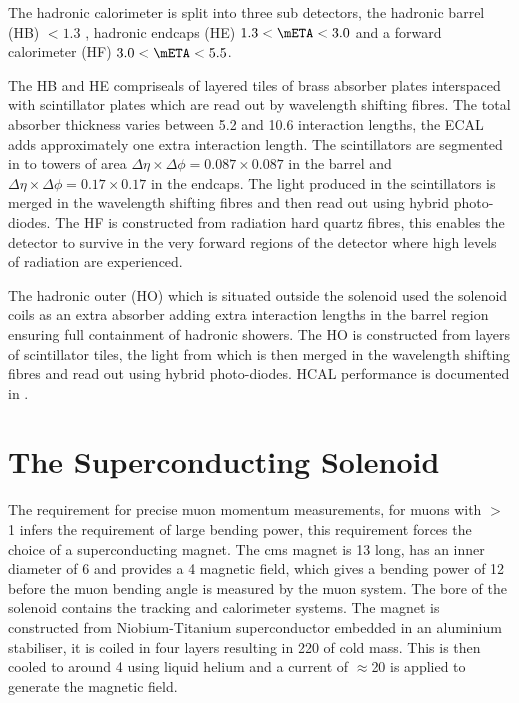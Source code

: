 The hadronic calorimeter is split into three sub detectors, the hadronic
barrel (HB) \mETA $< 1.3$ , hadronic endcaps (HE) $1.3 < \mETA < 3.0$ and a
forward calorimeter (HF) $3.0 < \mETA < 5.5$.

The HB and HE compriseals of layered tiles of brass absorber plates
interspaced with scintillator plates which are read out by wavelength shifting
fibres. The total absorber thickness varies between 5.2 and 10.6 interaction
lengths, the ECAL adds approximately one extra interaction length. The
scintillators are segmented in to towers of area $\Delta\eta\times\Delta\phi =
0.087\times0.087$ in the barrel and $\Delta\eta\times\Delta\phi =
0.17\times0.17$ in the endcaps. The light produced in the scintillators is
merged in the wavelength shifting fibres and then read out using hybrid
photo-diodes. The HF is constructed from radiation hard quartz fibres, this
enables the detector to survive in the very forward regions of the detector
where high levels of radiation are experienced.

The hadronic outer (HO) which is situated outside the solenoid used the
solenoid coils as an extra absorber adding extra interaction lengths in the
barrel region ensuring full containment of hadronic showers. The HO is
constructed from layers of scintillator tiles, the light from which is then merged in the wavelength shifting fibres and read out using hybrid photo-diodes.
HCAL performance is documented in \cite{CMS-DP-2010-025}.


\section{The Superconducting Solenoid} %
\label{sec:the_cms_super_conducting_solenoid}
The requirement for precise muon momentum measurements, for muons with \PT $>$
\unit{1}{\TeV} infers the requirement of large bending power, this requirement
forces the choice of a superconducting magnet. The \ac{cms} magnet is
\unit{13}{\meter} long, has an inner diameter of \unit{6}{\meter} and provides
a \unit{4}{\tesla} magnetic field, which gives a bending power of
\unit{12}{\tesla\meter} before the muon bending angle is measured by the muon
system. The bore of the solenoid contains the tracking and calorimeter systems.
The magnet is constructed from Niobium-Titanium superconductor embedded in an
aluminium stabiliser, it is coiled in four layers resulting in \unit{220}{\ton} 
of cold mass. This is then cooled to around \unit{4}{\kelvin} using liquid 
helium and a current of $\approx$\unit{20}{\kilo\ampere} is applied to generate 
the magnetic field.

